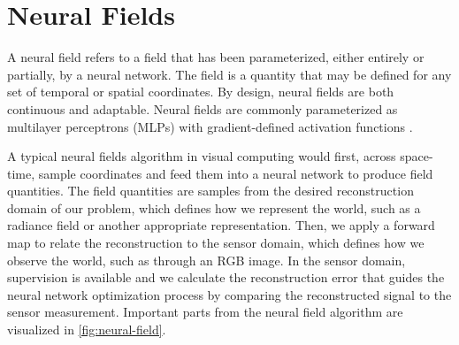 \section{Neural Fields} %
A neural field refers to a field that has been parameterized, either entirely or partially, by a neural network. The field is a quantity that may be defined for any set of temporal or spatial coordinates. By design, neural fields are both continuous and adaptable. Neural fields are commonly parameterized as multilayer perceptrons (MLPs) with gradient-defined activation functions \cite{xie_neural_2022}.

A typical neural fields algorithm in visual computing would first, across space-time, sample coordinates and feed them into a neural network to produce field quantities. The field quantities are samples from the desired reconstruction domain of our problem, which defines how we represent the world, such as a radiance field or another appropriate representation. Then, we apply a forward map to relate the reconstruction to the sensor domain, which defines how we observe the world, such as through an RGB image. In the sensor domain, supervision is available and we calculate the reconstruction error that guides the neural network optimization process by comparing the reconstructed signal to the sensor measurement. Important parts from the neural field algorithm are visualized in \autoref{fig:neural-field}.




